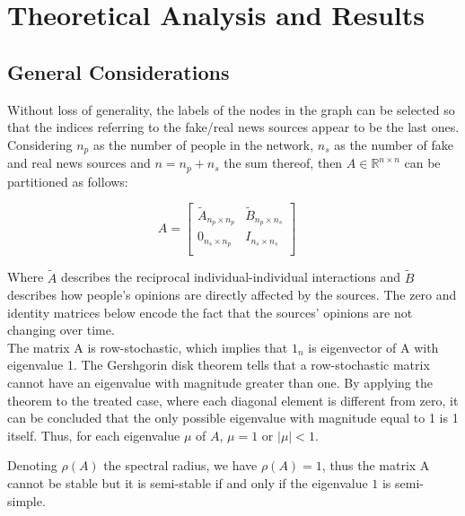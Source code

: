 \section{Theoretical Analysis and Results}
\label{sec:theoretical}
\subsection{General Considerations}
Without loss of generality, the labels of the nodes in the graph can be selected so that the indices referring to the fake/real news sources appear to be the last ones. Considering $n_p$ as the number of people in the network, $n_s$ as the number of fake and real news sources and $n = n_p + n_s$ the sum thereof, then $A \in \mathbb{R}^{ n \times n}$ can be partitioned as follows:

$$
A = 
\begin{bmatrix}
	\tilde{A}_{n_p \times n_p} & \tilde{B}_{n_p \times n_s} \\
	0_{n_s \times n_p} & I_{n_s \times n_s} \\
\end{bmatrix} 
\quad
$$

Where $\tilde{A}$ describes the reciprocal individual-individual interactions and $\tilde{B}$ describes how people's opinions are directly affected by the sources. The zero and identity matrices below encode the fact that the sources' opinions are not changing over time.\\

The matrix A is row-stochastic, which implies that $1_n$ is eigenvector of A with eigenvalue 1. The Gershgorin disk theorem tells that a row-stochastic matrix cannot have an eigenvalue with magnitude greater than one. By applying the theorem to the treated case, where each diagonal element is different from zero, it can be concluded that the only possible eigenvalue with magnitude equal to 1 is 1 itself. Thus, for each eigenvalue $\mu$ of $A$, $\mu=1$ or $|\mu|<1$.



Denoting $\rho(A)$ the spectral radius, we have $\rho(A) = 1$, thus the matrix A cannot be stable but it is semi-stable if and only if the eigenvalue $1$ is semi-simple.

